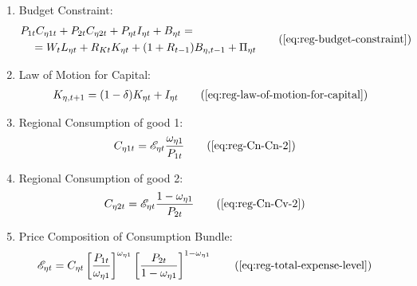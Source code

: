\documentclass[
thesis.tex
]{subfiles}
\begin{document}
{\begin{itemize}
	\begin{enumerate}

		\item Budget Constraint:
		\begin{align}
		\begin{split}
			& P_{1 t} C_{\eta 1 t} + P_{2 t} C_{\eta 2 t} + P_{\eta t} I_{\eta t} + B_{\eta t} = \\ & \quad = W_t L_{\eta t} + R_{Kt} K_{\eta t} + (1 + R_{t-1}) B_{\eta,t-1} + \Pi_{\eta t}
		\end{split} \tag{\ref{eq:reg-budget-constraint}}
		\end{align}

		\item Law of Motion for Capital:
		\begin{align}
			K_{\eta, t+1} = (1-\delta)K_{\eta t} + I_{\eta t} \tag{\ref{eq:reg-law-of-motion-for-capital}}
		\end{align}

		\item Regional Consumption of good 1:
		\begin{align}
			C_{\eta 1 t} &= \te \frac{\omega_{\eta 1}}{P_{1 t}} \tag{\ref{eq:reg-Cn-Cn-2}}
		\end{align}

		\item Regional Consumption of good 2:
		\begin{align}
			C_{\eta 2 t} &= \te \frac{1 -\omega_{\eta 1}}{P_{2 t}} \tag{\ref{eq:reg-Cn-Cv-2}}
		\end{align}

\begin{comment}
	
	\item Regional Consumption:
	\begin{align}
		C_{\eta t} = C_{\eta 1 t}^{\omega_{\eta 1}} C_{\eta 2 t}^{1-\omega_{\eta 1}} \tag{\ref{eq:reg-consumption-aggregation}}
	\end{align}

	\item Relative Consumption of Regional Goods:
	\begin{align}
		\frac{C_{\eta 1 t}}{C_{\eta 2 t}} = \frac{P_{\nu t}}{P_{\eta t}} \cdot \frac{\omega_{\eta 1}}{1 -\omega_{\eta 1}} \tag{\ref{eq:reg-FOC-C1-C2}}
	\end{align}	
	
\end{comment}

		\item Price Composition of Consumption Bundle:
		\begin{align}
			\te &= C_{\eta t} \left[ \frac{P_{1 t}}{\omega_{\eta 1}} \right]^{\omega_{\eta 1}} \left[ \frac{P_{2 t}}{1 -\omega_{\eta 1}} \right]^{1 -\omega_{\eta 1}} \tag{\ref{eq:reg-total-expense-level}}
		\end{align}


\end{enumerate}
\end{itemize}}
\end{document}
